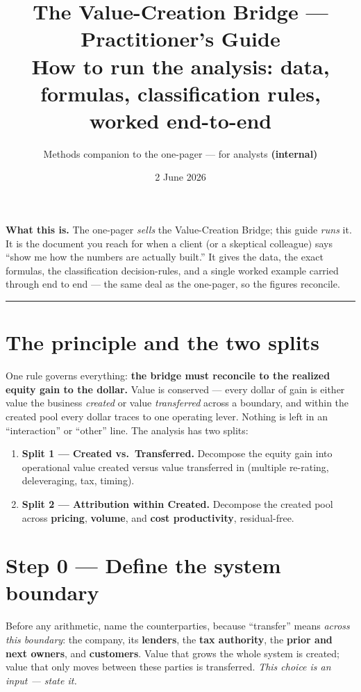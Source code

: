 \documentclass[11pt]{article}
\title{\textbf{\color{creonavy} The Value-Creation Bridge --- Practitioner's Guide}\\[3pt]
\large How to run the analysis: data, formulas, classification rules, worked end-to-end}
\author{\normalsize Methods companion to the one-pager --- for analysts \textbf{(internal)}}
\date{\normalsize 2 June 2026}
\begin{document}
\maketitle
\vspace{-1.5em}

\begin{note}
\textbf{What this is.} The one-pager \emph{sells} the Value-Creation Bridge; this guide
\emph{runs} it. It is the document you reach for when a client (or a skeptical colleague)
says ``show me how the numbers are actually built.'' It gives the data, the exact formulas,
the classification decision-rules, and a single worked example carried through end to end ---
the same deal as the one-pager, so the figures reconcile.
\end{note}

\tableofcontents
\vspace{0.6em}\hrule\vspace{0.8em}

\section{The principle and the two splits}
One rule governs everything: \textbf{the bridge must reconcile to the realized equity gain
to the dollar.} Value is conserved --- every dollar of gain is either value the business
\emph{created} or value \emph{transferred} across a boundary, and within the created pool
every dollar traces to one operating lever. Nothing is left in an ``interaction'' or
``other'' line. The analysis has two splits:

\begin{enumerate}
  \item \textbf{Split 1 --- Created vs.\ Transferred.} Decompose the equity gain into
  operational value created versus value transferred in (multiple re-rating, deleveraging,
  tax, timing).
  \item \textbf{Split 2 --- Attribution within Created.} Decompose the created pool across
  \textbf{pricing}, \textbf{volume}, and \textbf{cost productivity}, residual-free.
\end{enumerate}

\section{Step 0 --- Define the system boundary}
Before any arithmetic, name the counterparties, because ``transfer'' means \emph{across this
boundary}: the company, its \textbf{lenders}, the \textbf{tax authority}, the \textbf{prior
and next owners}, and \textbf{customers}. Value that grows the whole system is created; value
that only moves between these parties is transferred. \emph{This choice is an input --- state
it.}
\end{document}
